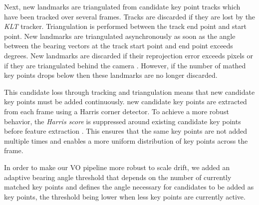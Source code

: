 Next, new landmarks are triangulated from candidate key point tracks which have been tracked over several frames. 
Tracks are discarded if they are lost by the \emph{KLT} tracker.
Triangulation is performed between the track end point and start point. 
New landmarks are triangulated asynchronously as soon as the angle between the bearing vectors at the track start point and end point exceeds \triangulationAngleThreshold degrees. 
New landmarks are discarded if their reprojection error exceeds \triangulationMaxReprError pixels or if they are triangulated behind the camera . However, if the number of mathed key points drops below \criticalKp then these landmarks are no longer discarded. \par 
This candidate loss through tracking and triangulation means that new candidate key points must be added continuously. 
\addCandidateEachFrame new candidate key points are extracted from each frame using a Harris corner detector. 
To achieve a more robust behavior, the \emph{Harris score} is suppressed around existing candidate key points before feature extraction . This ensures that the same key points are not added multiple times and enables a more uniform distribution of key points across the frame. \par
In order to make our VO pipeline more robust to scale drift, we added an adaptive bearing angle threshold that depends on the number of currently matched key points and defines the angle necessary for candidates to be added as key points, the threshold being lower when less key points are currently active.